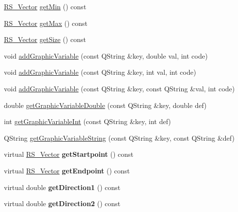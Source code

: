 \begin{DoxyCompactItemize}
\item 
\hyperlink{classRS__Vector}{R\-S\-\_\-\-Vector} \hyperlink{classRS__Entity_a952d0489c02974c4b46b7a82ef45d91e}{get\-Min} () const 
\item 
\hyperlink{classRS__Vector}{R\-S\-\_\-\-Vector} \hyperlink{classRS__Entity_ae29b7631a2b7d5c9d2294078058dc8a0}{get\-Max} () const 
\item 
\hyperlink{classRS__Vector}{R\-S\-\_\-\-Vector} \hyperlink{classRS__Entity_a6273fe38e8b5abee421413b88d33f984}{get\-Size} () const 
\item 
void \hyperlink{classRS__Entity_a1b61ea42914c741e33d7a141a31f5843}{add\-Graphic\-Variable} (const Q\-String \&key, double val, int code)
\item 
void \hyperlink{classRS__Entity_a10045ba0d9031e44d1b0563eb376a05c}{add\-Graphic\-Variable} (const Q\-String \&key, int val, int code)
\item 
void \hyperlink{classRS__Entity_a19354a94df611f1b8b8301d103bdadf3}{add\-Graphic\-Variable} (const Q\-String \&key, const Q\-String \&val, int code)
\item 
double \hyperlink{classRS__Entity_ab61f6ff018f0e26f46bd35c00049aa79}{get\-Graphic\-Variable\-Double} (const Q\-String \&key, double def)
\item 
int \hyperlink{classRS__Entity_a0e91fbf62e8b1c0e0c326ccadbb4543a}{get\-Graphic\-Variable\-Int} (const Q\-String \&key, int def)
\item 
Q\-String \hyperlink{classRS__Entity_a53867bd0a80dbd3925e647b0e56cb837}{get\-Graphic\-Variable\-String} (const Q\-String \&key, const Q\-String \&def)
\item 
\hypertarget{classRS__Entity_ac6651fe4bfacd3a5ca6ba3ab5c640917}{virtual \hyperlink{classRS__Vector}{R\-S\-\_\-\-Vector} {\bfseries get\-Startpoint} () const }\label{classRS__Entity_ac6651fe4bfacd3a5ca6ba3ab5c640917}

\item 
\hypertarget{classRS__Entity_a2938a83ce5dbc2801b3c6064a752547c}{virtual \hyperlink{classRS__Vector}{R\-S\-\_\-\-Vector} {\bfseries get\-Endpoint} () const }\label{classRS__Entity_a2938a83ce5dbc2801b3c6064a752547c}

\item 
\hypertarget{classRS__Entity_a01cac632191c7d22bba76726a0c81114}{virtual double {\bfseries get\-Direction1} () const }\label{classRS__Entity_a01cac632191c7d22bba76726a0c81114}

\item 
\hypertarget{classRS__Entity_ad0a8198c0df17156df56cb6d47cc9c64}{virtual double {\bfseries get\-Direction2} () const }\label{classRS__Entity_ad0a8198c0df17156df56cb6d47cc9c64}


\end{DoxyCompactItemize}
